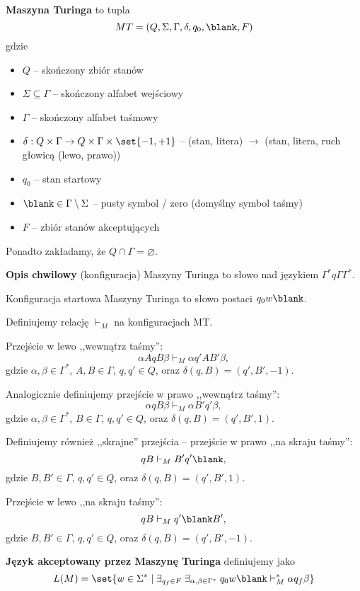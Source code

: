 \label{dmt}
\begin{definition}

 \textbf{Maszyna Turinga} to tupla
    \[
        MT = (Q, \Sigma, \Gamma, \delta, q_0, \blank, F)
    \]
    gdzie
    \begin{itemize}
        \item \( Q \) -- skończony zbiór stanów
        \item \( \Sigma \subseteq \Gamma \) -- skończony alfabet wejściowy
        \item \( \Gamma \) -- skończony alfabet taśmowy
        \item \( \delta : Q \times \Gamma \rightarrow 
        Q \times \Gamma \times \set{-1, +1}
        \) -- (stan, litera) \( \rightarrow \) (stan, litera, ruch głowicą (lewo, prawo))
        \item \( q_0 \) -- stan startowy
        \item \( \blank \in \Gamma \setminus \Sigma \) -- pusty symbol / zero (domyślny symbol taśmy)
        \item \( F \) -- zbiór stanów akceptujących
    \end{itemize}
    
    Ponadto zakładamy, że \(Q \cap \Gamma = \varnothing\). 
\end{definition}

\begin{definition}
    \textbf{Opis chwilowy} (konfiguracja) Maszyny Turinga to słowo nad językiem \(\Gamma^* q\Gamma \Gamma^* \). 
\end{definition}

\begin{definition}
    Konfiguracja startowa Maszyny Turinga to słowo postaci \(q_0w\blank\).
\end{definition}

\begin{definition}
    Definiujemy relację \( \vdash_M \) na konfiguracjach MT.
    
    Przejście w lewo ,,wewnątrz taśmy'':
    \[
        \alpha A q B \beta 
        \vdash_M
        \alpha q' A B' \beta,
    \]
    gdzie \(\alpha, \beta \in \Gamma^*\), \(A, B \in \Gamma\), \(q, q'\in Q\), oraz \(\delta(q, B) = (q', B', -1)\).
    
    Analogicznie definiujemy przejście w prawo ,,wewnątrz taśmy'':
    \[
        \alpha q B \beta 
        \vdash_M
        \alpha B' q' \beta,
    \] 
    gdzie \(\alpha, \beta \in \Gamma^*\), \(B \in \Gamma\), \(q, q'\in Q\), oraz \(   \delta(q, B) = (q', B', 1) \).
    
    Definiujemy również ,,skrajne'' przejścia -- przejście w prawo ,,na skraju taśmy'':
    \[ 
        q B 
        \vdash_M
        B' q' \blank,
    \]
    gdzie \(B, B' \in \Gamma\), \(q, q' \in Q\), oraz \( \delta(q, B) = (q', B', 1) \).

    Przejście w lewo ,,na skraju taśmy'':
    \[
         q B 
        \vdash_M
        q' \blank B',
    \]
    gdzie \(B, B' \in \Gamma\), \(q, q' \in Q\), oraz \( \delta(q, B) = (q', B', -1)\).

    
\end{definition}


\begin{definition}
    \textbf{Język akceptowany przez Maszynę Turinga} definiujemy jako
    \[
        L(M) = \set{w \in \Sigma^* \mid \exists_{q_f \in F}\; \exists_{\alpha, \beta \in \Gamma^*}\; q_0w\blank \vdash_M^* \alpha q_f \beta}
    \]
\end{definition}

